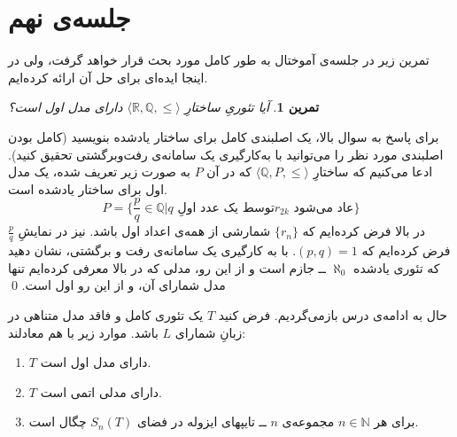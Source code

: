 \documentclass[12pt,a4paper]{article}
\theoremstyle{colorhead}
\newtheorem{tam}[thm]{تمرین}
\begin{document}
\section{جلسه‌ی نهم}
تمرین زیر در جلسه‌ی آموختال به طور کامل مورد بحث قرار خواهد گرفت، ولی در اینجا ایده‌ای برای حل آن ارائه کرده‌ایم. 
\begin{tam}
آیا تئوریِ ساختارِ
$\langle \mathbb{R},\mathbb{Q},\leq \rangle$
دارای مدل اول است؟
\end{tam}
برای پاسخ به سوال بالا، یک اصلبندی کامل برای ساختار یادشده بنویسید (کامل بودن اصلبندی مورد نظر را می‌توانید با به‌کارگیری یک سامانه‌ی رفت‌وبرگشتی تحقیق کنید).
ادعا می‌کنیم که  
ساختارِ
$\langle \mathbb{Q}, P,\leq\rangle$
که در آن
$P$
به صورت زیر تعریف شده،  یک مدل اول برای ساختار یادشده است.
\[
P=\{\frac{p}{q}\in \mathbb{Q}|\text{$q$ توسط یک عدد اولِ
$r_{2k}$ عاد می‌شود}\}
\]
در بالا فرض کرده‌ایم که
$\{r_n\}$
شمارشی از همه‌ی اعداد اول باشد. نیز در نمایشِ
$\frac{p}{q}$
فرض کرده‌ایم که
$(p,q)=1$.
با به کارگیری یک سامانه‌ی رفت و برگشتی، نشان دهید که تئوری یادشده 
$\aleph_0$
ــ
جازم است و از این رو، مدلی که در بالا معرفی کرده‌ایم تنها مدل شمارای آن، و از این رو اول است.
\qed
\par 
حال به ادامه‌ی درس بازمی‌گردیم. 
فرض کنید 
$T$
یک تئوری کامل و فاقد مدل متناهی در زبانِ شمارای 
$L$
باشد. موارد زیر با هم معادلند:
\begin{enumerate}
\item 
$T$
دارای مدل اول است.
\item 
$T$
دارای مدلی اتمی است.
\item 
برای هر
$n\in \mathbb{N}$
مجموعه‌ی
$n$
ــ
تایپهای ایزوله در فضای
$S_n(T)$
چگال است. 
\end{enumerate}
\end{document}
